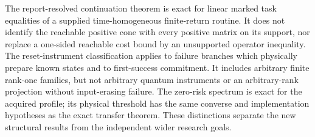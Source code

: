 

The report-resolved continuation theorem is exact for linear marked task equalities of a supplied time-homogeneous finite-return routine. It does not identify the reachable positive cone with every positive matrix on its support, nor replace a one-sided reachable cost bound by an unsupported operator inequality. The reset-instrument classification applies to failure branches which physically prepare known states and to first-success commitment. It includes arbitrary finite rank-one families, but not arbitrary quantum instruments or an arbitrary-rank projection without input-erasing failure. The zero-risk spectrum is exact for the acquired profile; its physical threshold has the same converse and implementation hypotheses as the exact transfer theorem. These distinctions separate the new structural results from the independent wider research goals.
